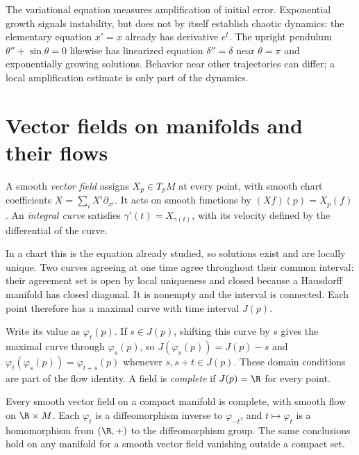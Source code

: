 The variational equation measures amplification of initial error. Exponential growth signals instability, but does not by itself establish chaotic dynamics: the elementary equation $x'=x$ already has derivative $e^t$. The upright pendulum $\theta''+\sin\theta=0$ likewise has linearized equation $\delta''=\delta$ near $\theta=\pi$ and exponentially growing solutions. Behavior near other trajectories can differ; a local amplification estimate is only part of the dynamics.

\section{Vector fields on manifolds and their flows}

\begin{definition}
A smooth \emph{vector field} assigns $X_p\in T_pM$ at every point, with smooth chart coefficients $X=\sum_iX^i\partial_{x^i}$. It acts on smooth functions by $(Xf)(p)=X_p(f)$. An \emph{integral curve} satisfies $\gamma'(t)=X_{\gamma(t)}$, with its velocity defined by the differential of the curve.
\end{definition}

In a chart this is the equation already studied, so solutions exist and are locally unique. Two curves agreeing at one time agree throughout their common interval: their agreement set is open by local uniqueness and closed because a Hausdorff manifold has closed diagonal. It is nonempty and the interval is connected. Each point therefore has a maximal curve with time interval $J(p)$.

Write its value as $\varphi_t(p)$. If $s\in J(p)$, shifting this curve by $s$ gives the maximal curve through $\varphi_s(p)$, so $J(\varphi_s(p))=J(p)-s$ and
$\varphi_t(\varphi_s(p))=\varphi_{t+s}(p)$ whenever $s,s+t\in J(p)$. These domain conditions are part of the flow identity. A field is \emph{complete} if $J(p)=\R$ for every point.

\begin{theorem}\label{thm:complete}
Every smooth vector field on a compact manifold is complete, with smooth flow on $\R\times M$. Each $\varphi_t$ is a diffeomorphism inverse to $\varphi_{-t}$, and $t\mapsto\varphi_t$ is a homomorphism from $(\R,+)$ to the diffeomorphism group. The same conclusions hold on any manifold for a smooth vector field vanishing outside a compact set.
\end{theorem}

